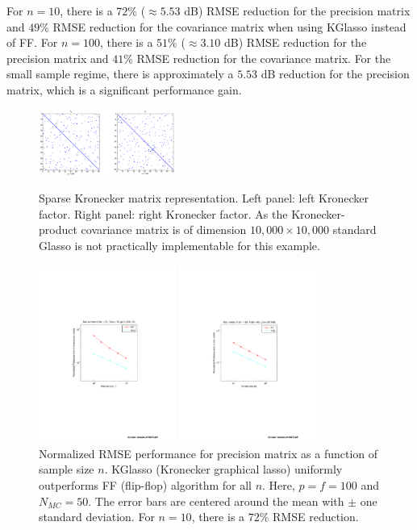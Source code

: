 \documentclass[journal,11pt,draftcls,onecolumn]{IEEEtran}
\begin{document}
For $n=10$, there is a $72 \%$ ($\approx 5.53$ dB) RMSE reduction for the precision matrix and $49 \%$ RMSE reduction for the covariance matrix when using KGlasso instead of FF. For $n=100$, there is a $51 \%$ ($\approx 3.10$ dB) RMSE reduction for the precision matrix and $41 \%$ RMSE reduction for the covariance matrix. For the small sample regime, there is approximately a $5.53$ dB reduction for the precision matrix, which is a significant performance gain.
\begin{figure}[htp]
	\centering
		\includegraphics[width=0.40\textwidth]{./Sim/pf100matrices.png}
	\caption{Sparse Kronecker matrix representation. Left panel: left Kronecker factor. Right panel: right Kronecker factor. As the Kronecker-product covariance matrix is of dimension $10,000 \times 10,000$ standard Glasso is not practically implementable for this example.}
	\label{fig: sim4_matrices}
	\vfill
		 \includegraphics[width=0.40\textwidth]{./Sim/KGL_FF_sim_21-Mar-2012-22-15_Frob_inv_std_all.pdf}
	\caption{Normalized RMSE performance for precision matrix as a function of sample size $n$. KGlasso (Kronecker graphical lasso) uniformly outperforms FF (flip-flop) algorithm for all $n$. Here, $p=f=100$ and $N_{MC}=50$. The error bars are centered around the mean with $\pm$ one standard deviation. For $n=10$, there is a $72 \%$ RMSE reduction.  }
	\label{fig: sim4_frob_inv}
	\vfill
		 \includegraphics[width=0.40\textwidth]{./Sim/KGL_FF_sim_21-Mar-2012-22-15_Frob_cov_std_all.pdf}

\end{figure}
\end{document}

